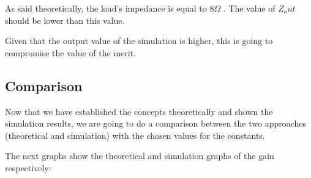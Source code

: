 %

As said theoretically, the load's impedance is equal to 8$\Omega$ . The value of $Z_out$ should be lower than this value. \par
Given that the output value of the simulation is higher, this is going to compromise the value of the merit.

\subsection{Comparison}

Now that we have established the concepts theoretically and shown the simulation results, we are going to do a comparison between the two approaches (theoretical and simulation) with the chosen values for the constants. \par
The next graphs show the theoretical and simulation graphs of the gain respectively:


